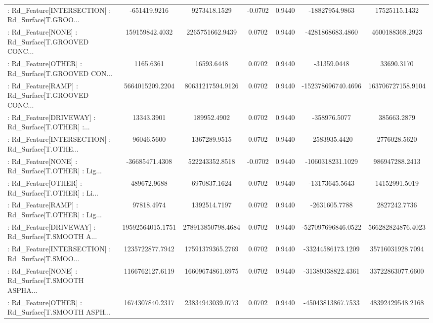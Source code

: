 \begin{longtable}{p{4cm}cccccc}
 : Rd\_Feature[INTERSECTION] : Rd\_Surface[T.GROO... &      -651419.9216 &      9273418.1529 & -0.0702 &       0.9440 &     -18827954.9863 &     17525115.1432 \\
 : Rd\_Feature[NONE] : Rd\_Surface[T.GROOVED CONC... &    159159842.4032 &   2265751662.9439 &  0.0702 &       0.9440 &   -4281868683.4860 &   4600188368.2923 \\
 : Rd\_Feature[OTHER] : Rd\_Surface[T.GROOVED CON... &         1165.6361 &        16593.6448 &  0.0702 &       0.9440 &        -31359.0448 &        33690.3170 \\
 : Rd\_Feature[RAMP] : Rd\_Surface[T.GROOVED CONC... &   5664015209.2204 &  80631217594.9126 &  0.0702 &       0.9440 & -152378696740.4696 & 163706727158.9104 \\
 : Rd\_Feature[DRIVEWAY] : Rd\_Surface[T.OTHER] :... &        13343.3901 &       189952.4902 &  0.0702 &       0.9440 &       -358976.5077 &       385663.2879 \\
 : Rd\_Feature[INTERSECTION] : Rd\_Surface[T.OTHE... &        96046.5600 &      1367289.9515 &  0.0702 &       0.9440 &      -2583935.4420 &      2776028.5620 \\
 : Rd\_Feature[NONE] : Rd\_Surface[T.OTHER] : Lig... &    -36685471.4308 &    522243352.8518 & -0.0702 &       0.9440 &   -1060318231.1029 &    986947288.2413 \\
 : Rd\_Feature[OTHER] : Rd\_Surface[T.OTHER] : Li... &       489672.9688 &      6970837.1624 &  0.0702 &       0.9440 &     -13173645.5643 &     14152991.5019 \\
 : Rd\_Feature[RAMP] : Rd\_Surface[T.OTHER] : Lig... &        97818.4974 &      1392514.7197 &  0.0702 &       0.9440 &      -2631605.7788 &      2827242.7736 \\
 : Rd\_Feature[DRIVEWAY] : Rd\_Surface[T.SMOOTH A... &  19592564015.1751 & 278913850798.4684 &  0.0702 &       0.9440 & -527097696846.0522 & 566282824876.4023 \\
 : Rd\_Feature[INTERSECTION] : Rd\_Surface[T.SMOO... &   1235722877.7942 &  17591379365.2769 &  0.0702 &       0.9440 &  -33244586173.1209 &  35716031928.7094 \\
 : Rd\_Feature[NONE] : Rd\_Surface[T.SMOOTH ASPHA... &   1166762127.6119 &  16609674861.6975 &  0.0702 &       0.9440 &  -31389338822.4361 &  33722863077.6600 \\
 : Rd\_Feature[OTHER] : Rd\_Surface[T.SMOOTH ASPH... &   1674307840.2317 &  23834943039.0773 &  0.0702 &       0.9440 &  -45043813867.7533 &  48392429548.2168 \\

\end{longtable}
